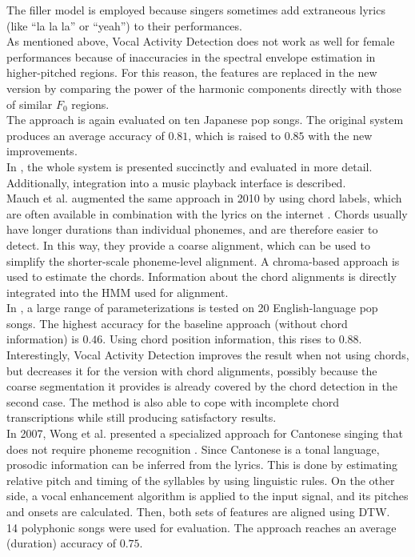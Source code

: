 The filler model is employed because singers sometimes add extraneous lyrics (like ``la la la'' or ``yeah'') to their performances.\\
As mentioned above, Vocal Activity Detection does not work as well for female performances because of inaccuracies in the spectral envelope estimation in higher-pitched regions. For this reason, the features are replaced in the new version by comparing the power of the harmonic components directly with those of similar $F_0$ regions.\\
The approach is again evaluated on ten Japanese pop songs. The original system produces an average accuracy of $0.81$, which is raised to $0.85$ with the new improvements.\\
In \cite{FujiharaGOO11}, the whole system is presented succinctly and evaluated in more detail. Additionally, integration into a music playback interface is described.\\

Mauch et al. augmented the same approach in 2010 by using chord labels, which are often available in combination with the lyrics on the internet \cite{mauch_alignment2010}\cite{mauch_alignment2}. Chords usually have longer durations than individual phonemes, and are therefore easier to detect. In this way, they provide a coarse alignment, which can be used to simplify the shorter-scale phoneme-level alignment. A chroma-based approach is used to estimate the chords. Information about the chord alignments is directly integrated into the HMM used for alignment.\\
In \cite{mauch_alignment2}, a large range of parameterizations is tested on 20 English-language pop songs. The highest accuracy for the baseline approach (without chord information) is $0.46$. Using chord position information, this rises to $0.88$. Interestingly, Vocal Activity Detection improves the result when not using chords, but decreases it for the version with chord alignments, possibly because the coarse segmentation it provides is already covered by the chord detection in the second case. The method is also able to cope with incomplete chord transcriptions while still producing satisfactory results.\\

In 2007, Wong et al. presented a specialized approach for Cantonese singing that does not require phoneme recognition \cite{WongSW07}. Since Cantonese is a tonal language, prosodic information can be inferred from the lyrics. This is done by estimating relative pitch and timing of the syllables by using linguistic rules. On the other side, a vocal enhancement algorithm is applied to the input signal, and its pitches and onsets are calculated. Then, both sets of features are aligned using DTW.\\ 
14 polyphonic songs were used for evaluation. The approach reaches an average (duration) accuracy of $0.75$.\\

